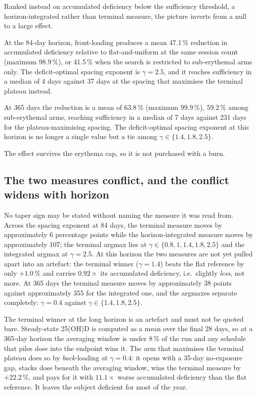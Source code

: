 \documentclass[11pt]{article}
\begin{document}
Ranked instead on accumulated deficiency below the sufficiency
threshold, a horizon-integrated rather than terminal measure, the
picture inverts from a null to a large effect.

At the 84-day horizon, front-loading produces a mean 47.1\,\%
reduction in accumulated deficiency relative to flat-and-uniform at
the same session count (maximum 98.9\,\%), or 41.5\,\% when the search
is restricted to sub-erythemal arms only. The deficit-optimal spacing
exponent is $\gamma = 2.5$, and it reaches sufficiency in a median of
4 days against 37 days at the spacing that maximises the terminal
plateau instead.

At 365 days the reduction is a mean of 63.8\,\% (maximum 99.9\,\%),
59.2\,\% among sub-erythemal arms, reaching sufficiency in a median of
7 days against 231 days for the plateau-maximising spacing. The
deficit-optimal spacing exponent at this horizon is no longer a
single value but a tie among $\gamma \in \{1.4, 1.8, 2.5\}$.

The effect survives the erythema cap, so it is not purchased with a
burn.

\subsection{The two measures conflict, and the conflict widens with horizon}

No taper sign may be stated without naming the measure it was read
from. Across the spacing exponent at 84 days, the terminal measure
moves by approximately 6 percentage points while the horizon-integrated
measure moves by approximately 107; the terminal argmax lies at
$\gamma \in \{0.8, 1, 1.4, 1.8, 2.5\}$ and the integrated argmax at
$\gamma = 2.5$. At this horizon the two measures are not yet pulled
apart into an artefact: the terminal winner ($\gamma = 1.4$) beats the
flat reference by only $+1.0\,\%$ and carries $0.92\times$ its
accumulated deficiency, i.e.\ slightly \emph{less}, not more. At 365
days the terminal measure moves by approximately 38 points against
approximately 355 for the integrated one, and the argmaxes separate
completely: $\gamma = 0.4$ against $\gamma \in \{1.4, 1.8, 2.5\}$.

The terminal winner at the long horizon is an artefact and must not be
quoted bare. Steady-state 25(OH)D is computed as a mean over the final
28 days, so at a 365-day horizon the averaging window is under 8\,\%
of the run and any schedule that piles dose into the endpoint wins it.
The arm that maximises the terminal plateau does so by
\emph{back}-loading at $\gamma = 0.4$: it opens with a 35-day
no-exposure gap, stacks dose beneath the averaging window, wins the
terminal measure by $+22.2\,\%$, and pays for it with $11.1\times$
worse accumulated deficiency than the flat reference. It leaves the
subject deficient for most of the year.
\end{document}
